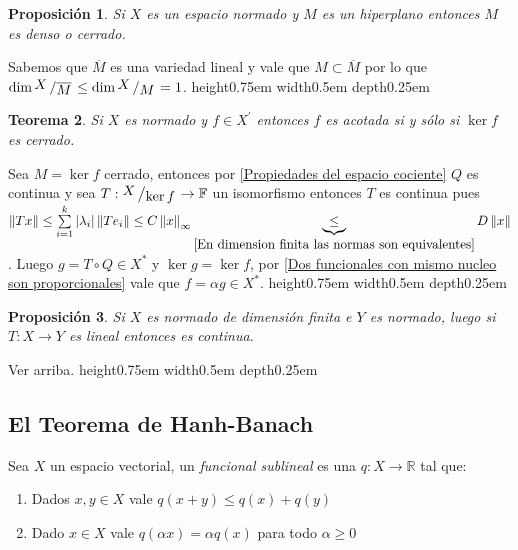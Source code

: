 \documentclass[11pt]{article}
\newcommand{\R}{{\mathbb{R}}}
\newcommand{\norm}[1]{\left\lVert#1\right\rVert}
\newcommand{\abs}[1]{\left\lvert#1\right\rvert}
\newcommand{\quotient}[2]{{\raisebox{.2em}{$#1$}\left/\raisebox{-.2em}{$#2$}\right.}}
\newtheorem{theorem}{Teorema}
\numberwithin{theorem}{subsection}
\newtheorem{proposition}[theorem]{Proposici\'on}
\newenvironment{proof}[1][Demostraci\'on]{\begin{trivlist}
		\item[\hskip \labelsep {\bfseries #1}]}{\end{trivlist}}
\newenvironment{definition}[1][Definici\'on]{\begin{trivlist}
		\item[\hskip \labelsep {\bfseries #1}]}{\end{trivlist}}
\newcommand{\qed}{\nobreak \ifvmode \relax \else
	\ifdim\lastskip<1.5em \hskip-\lastskip
	\hskip1.5em plus0em minus0.5em \fi \nobreak
	\vrule height0.75em width0.5em depth0.25em\fi}
\begin{document}
\begin{proposition}
	\label{Hiperplano en normado es cerrado o denso}
	Si $X$ es un espacio normado y $M$ es un hiperplano entonces $M$ es denso o cerrado.
\end{proposition}

\begin{proof}
	Sabemos que $\overline{M}$ es una variedad lineal y vale que $M \subset \overline{M}$ por lo que $\dim \quotient{X}{\overline{M}} \leq \dim \quotient{X}{M} = 1$. \qed
\end{proof}

\begin{theorem}
	\label{Un funcional es continuo sii su nucleo es cerrado}
	Si $X$ es normado y $f \in X^{'}$ entonces $f$ es acotada si y s\'olo si $\ker f$ es cerrado.
\end{theorem}

\begin{proof}
	Sea $M = \ker f$ cerrado, entonces por \ref{Propiedades del espacio cociente} $Q$ es continua y sea $T : \quotient{X}{\ker f} \rightarrow \mathbb{F}$ un isomorfismo entonces $T$ es continua pues $\norm{Tx} \leq \sum\limits_{i=1}^{k}{\abs{\lambda_i}\norm{Te_i}} \leq C\norm{x}_{\infty} \underbrace{\leq}_{\ref{En dimension finita las normas son equivalentes}} D \norm{x}$. Luego $g = T \circ Q \in X^{\ast}$ y $\ker g = \ker f$, por \ref{Dos funcionales con mismo nucleo son proporcionales} vale que $f = \alpha g \in X^{\ast}$. \qed
\end{proof}

\begin{proposition}
	\label{Operador desde un espacio de dim finita es continuo}
	Si $X$ es normado de dimensi\'on finita e $Y$ es normado, luego si $T: X \rightarrow Y$ es lineal entonces es continua.
\end{proposition}

\begin{proof}
	Ver arriba. \qed
\end{proof}

\subsection{El Teorema de Hanh-Banach}

\begin{definition}
	Sea $X$ un espacio vectorial, un \textit{funcional sublineal} es una $q : X \rightarrow \R$ tal que:
	
	\begin{enumerate}
		
		\item Dados $x,y \in X$ vale $q(x+y) \leq q(x) + q(y)$
		\item Dado $x \in X$ vale $q(\alpha x) = \alpha q(x)$ para todo $\alpha \geq 0$	
	\end{enumerate}
	
\end{definition}
\end{document}
